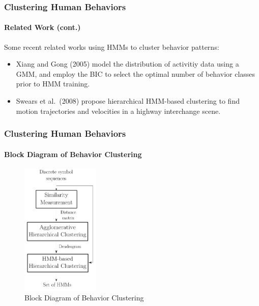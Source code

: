 
\begin{frame}
    \frametitle{Clustering Human Behaviors}
    \framesubtitle{Related Work (cont.)}

    Some recent related works using HMMs to cluster behavior patterns:

    \begin{itemize}
        \item Xiang and Gong (2005) model the distribution of activitiy data using 
            a GMM, and employ the BIC to select the optimal number of behavior 
            classes prior to HMM training. 
        \item Swears et al.\ (2008) propose hierarchical HMM-based clustering to 
            find motion trajectories and velocities in a highway interchange scene.
    \end{itemize}
    
\end{frame}


\begin{frame}
    \frametitle{Clustering Human Behaviors}
    \framesubtitle{Block Diagram of Behavior Clustering}
    
    \begin{figure}
        \begin{center}
            \includegraphics[height=2.5in]{figures/behavior-clustering-block-diagram}
            \caption{Block Diagram of Behavior Clustering}
            \label{fig:behavior-clustering-block-diagram}
        \end{center}
    \end{figure}
    
\end{frame}

